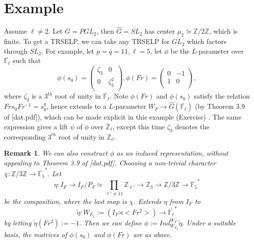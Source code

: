 \documentclass{article}
\newcommand{\blue}[1]{\textcolor{blue}{#1}}
\newtheorem*{remark}{Remark}
\begin{document}
	
	\section{Example}
	
	Assume $\ell \neq 2$. Let $G=PGL_2$, then $\hat{G}=SL_2$ has center $\mu_2 \simeq \mathbb{Z}/2\mathbb{Z}$, which is finite. To get a TRSELP, we can take any TRSELP for $GL_2$ which factors through $SL_2$. For example, let $p=q=11, \ell=5$, let $\phi$ be the $L$-parameter over $\overline{\mathbb{F}_{\ell}}$ such that $$\phi(s_0)=\begin{pmatrix} 
		\zeta_3 & 0 \\
		0 & \zeta_3^2 \\
	\end{pmatrix}, \phi(Fr)=\begin{pmatrix} 
		0 & -1 \\
		1 & 0 \\
	\end{pmatrix},$$
	where $\zeta_3$ is a $3^{th}$ root of unity in $\overline{\mathbb{F}_{\ell}}$. Note $\phi(Fr)$ and $\phi(s_0)$ satisfy the relation $Frs_0Fr^{-1}=s_0^q$, hence extends to a $L$-parameter $W_F \to \hat{G}(\overline{\mathbb{F}_{\ell}})$ (by Theorem 3.9 of [dat.pdf]), %
		which can be made explicit in this example (Exercise)%
	. The same expression gives a lift $\psi$ of $\phi$ over $\overline{\mathbb{Z}}_{\ell}$, except this time $\zeta_3$ denotes the corresponding $3^{th}$ root of unity in $\overline{\mathbb{Z}}_{\ell}$.
	
	\begin{remark}
		We can also construct $\phi$ as an induced representation, without appealing to Theorem 3.9 of [dat.pdf]. Choosing a non-trivial character $\chi: \mathbb{Z}/3\mathbb{Z} \to \overline{\mathbb{F}_5}^*.$ Let $$\eta: I_F \to I_F/P_F \simeq \prod_{\ell' \neq 11}\mathbb{Z}_{\ell'} \to \mathbb{Z}_3 \to \mathbb{Z}/3\mathbb{Z} \to \overline{\mathbb{F}_5}^*$$ be the composition, where the last map is $\chi$. Extends $\eta$ from $I_F$ to 
		$$\tilde{\eta}: W_{F_2}:= (I_F \rtimes <Fr^2>) \to \overline{\mathbb{F}_{\ell}}^*$$ 
		by letting $\tilde{\eta}(Fr^2):=-1$. Then we can define $\phi:=Ind_{W_{F_2}}^{W_F}\tilde{\eta}.$ Under a suitable basis, the matrices of $\phi(s_0)$ and $\phi(Fr)$ are as above.
	\end{remark}
	
\end{document}
